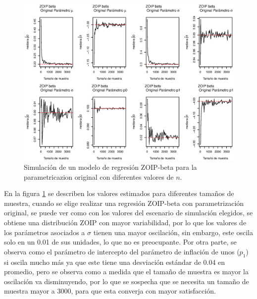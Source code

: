 \begin{figure}
	\begin{center}
		\includegraphics[scale=0.5]{Converg_Ori.eps}	
		\caption{Simulaci\'{o}n de un modelo de regresi\'{o}n ZOIP-beta para la parametricazion ori\-gi\-nal con diferentes valores de $n$.}
		\label{Simu_Ori}
	\end{center}
\end{figure}

En la figura \ref{Simu_Ori} se describen los valores estimados para diferentes tama\~{n}os de muestra, cuando se elige realizar una regresi\'{o}n ZOIP-beta con parametrizaci\'{o}n original, se puede ver como con los valores del escenario de simulaci\'{o}n elegidos, se obtiene una distribuci\'{o}n ZOIP con mayor variabilidad, por lo que los valores de los par\'{a}metros asociados a $\sigma$ tienen una mayor oscilaci\'{o}n, sin embargo, este oscila solo en un 0.01 de sus unidades, lo que no es preocupante. Por otra parte, se observa como el par\'{a}metro de intercepto del par\'{a}metro de inflaci\'{o}n de unos ($p_1$) si oscila mucho m\'{a}s ya que este tiene una desviaci\'{o}n est\'{a}ndar de 0.04 en promedio, pero se observa como a medida que el tama\~{n}o de muestra es mayor la oscilaci\'{o}n va dis\-mi\-nu\-yen\-do, por lo que se sospecha que se necesita un tama\~{n}o de muestra mayor a 3000, para que esta converja con mayor satisfacci\'{o}n.\\

